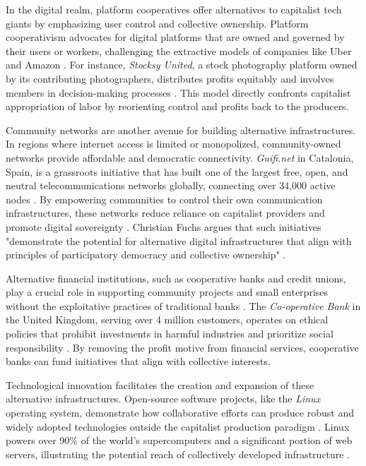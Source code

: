\begin{refsection}
In the digital realm, platform cooperatives offer alternatives to capitalist tech giants by emphasizing user control and collective ownership. Platform cooperativism advocates for digital platforms that are owned and governed by their users or workers, challenging the extractive models of companies like Uber and Amazon \cite[pp.~88-90]{Scholz2016}. For instance, \textit{Stocksy United}, a stock photography platform owned by its contributing photographers, distributes profits equitably and involves members in decision-making processes \cite[pp.~66-68]{Lobato2016}. This model directly confronts capitalist appropriation of labor by reorienting control and profits back to the producers.

Community networks are another avenue for building alternative infrastructures. In regions where internet access is limited or monopolized, community-owned networks provide affordable and democratic connectivity. \textit{Guifi.net} in Catalonia, Spain, is a grassroots initiative that has built one of the largest free, open, and neutral telecommunications networks globally, connecting over 34,000 active nodes \cite[pp.~150-165]{Baig2015}. By empowering communities to control their own communication infrastructures, these networks reduce reliance on capitalist providers and promote digital sovereignty \cite[pp.~200-202]{Fuchs2020}. Christian Fuchs argues that such initiatives "demonstrate the potential for alternative digital infrastructures that align with principles of participatory democracy and collective ownership" \cite[pp.~201]{Fuchs2020}.

Alternative financial institutions, such as cooperative banks and credit unions, play a crucial role in supporting community projects and small enterprises without the exploitative practices of traditional banks \cite[pp.~120-122]{Restakis2010}. The \textit{Co-operative Bank} in the United Kingdom, serving over 4 million customers, operates on ethical policies that prohibit investments in harmful industries and prioritize social responsibility \cite[pp.~33-35]{Birchall2013}. By removing the profit motive from financial services, cooperative banks can fund initiatives that align with collective interests.

Technological innovation facilitates the creation and expansion of these alternative infrastructures. Open-source software projects, like the \textit{Linux} operating system, demonstrate how collaborative efforts can produce robust and widely adopted technologies outside the capitalist production paradigm \cite[pp.~85-88]{Raymond2001}. Linux powers over 90\% of the world's supercomputers and a significant portion of web servers, illustrating the potential reach of collectively developed infrastructure \cite[pp.~136-138]{LinuxFoundation2020}.


\end{refsection}
